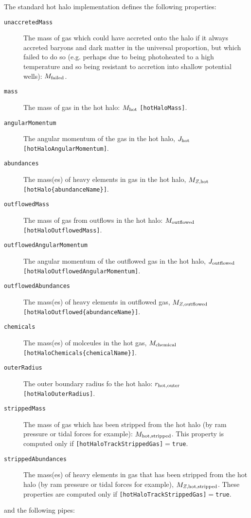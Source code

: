 The standard hot halo implementation defines the following properties:
\begin{description}
 \item [{\tt unaccretedMass}] The mass of gas which could have accreted onto the halo if it always accreted baryons and dark matter in the universal proportion, but which failed to do so (e.g. perhaps due to being photoheated to a high temperature and so being resistant to accretion into shallow potential wells): $M_{\rm failed}$.
 \item [{\tt mass}] The mass of gas in the hot halo: $M_{\rm hot}$ {\tt [hotHaloMass]}.
 \item [{\tt angularMomentum}] The angular momentum of the gas in the hot halo, $J_{\rm hot}$ {\tt [hotHaloAngularMomentum]}.
 \item [{\tt abundances}] The mass(es) of heavy elements in gas in the hot halo, $M_{Z, {\rm hot}}$ {\tt [hotHalo\{abundanceName\}]}.
 \item [{\tt outflowedMass}] The mass of gas from outflows in the hot halo: $M_{\rm outflowed}$ {\tt [hotHaloOutflowedMass]}.
 \item [{\tt outflowedAngularMomentum}] The angular momentum of the outflowed gas in the hot halo, $J_{\rm outflowed}$ {\tt [hotHaloOutflowedAngularMomentum]}.
 \item [{\tt outflowedAbundances}] The mass(es) of heavy elements in outflowed gas, $M_{Z, {\rm outflowed}}$ {\tt [hotHaloOutflowed\{abundanceName\}]}.
 \item [{\tt chemicals}] The mass(es) of molceules in the hot gas, $M_{\rm chemical}$ {\tt [hotHaloChemicals\{chemicalName\}]}.
 \item [{\tt outerRadius}] The outer boundary radius fo the hot halo: $r_{\rm hot, outer}$ {\tt [hotHaloOuterRadius]}.
 \item [{\tt strippedMass}] The mass of gas which has been stripped from the hot halo (by ram pressure or tidal forces for example): $M_{\rm hot, stripped}$. This property is computed only if {\tt [hotHaloTrackStrippedGas]}$=${\tt true}.
 \item [{\tt strippedAbundances}] The mass(es) of heavy elements in gas that has been stripped from the hot halo (by ram pressure or tidal forces for example), $M_{Z, {\rm hot, stripped}}$. These properties are computed only if {\tt [hotHaloTrackStrippedGas]}$=${\tt true}.
\end{description}
and the following pipes:
